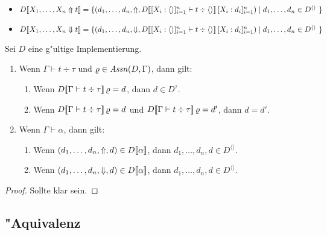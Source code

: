 \documentclass[%
  12pt,%
  a4paper,%
]{article}
\newcommand{\Tj}[3]{{#1}\vdash{#2}\div{#3}}
\begin{document}
\begin{itemize}
\item $D\sem{X_1,\ldots,X_n \Uparrow t} \\
  =
  \{(d_1,\ldots,d_n,\Uparrow,D\sem{\Tj{[X_i:\langle\rangle]_{i=1}^n}{t}{\langle \rangle}}\,[X_i:d_i]_{i=1}^n) \mid
    \text{$d_1,\ldots,d_n \in D^{\langle \rangle}$ }
  \}$
\item $D\sem{X_1,\ldots,X_n \Downarrow t} \\
  =
  \{(d_1,\ldots,d_n,\Downarrow,D\sem{\Tj{[X_i:\langle\rangle]_{i=1}^n}{t}{\langle \rangle}}\,[X_i:d_i]_{i=1}^n) \mid
    \text{$d_1,\ldots,d_n \in D^{\langle \rangle}$ }
  \}$
\end{itemize}

\begin{lemma} \label{lem:Wohldefiniertheit_der_Semantik}
  Sei $D$ eine g"ultige Implementierung.
  \begin{enumerate}
  \item Wenn $\Tj{\Gamma}{t}{\tau}$ und $\varrho \in \mathit{Assn}(D,\Gamma)$, dann gilt:
    \begin{enumerate}
    \item Wenn $D\sem{\Tj{\Gamma}{t}{\tau}}\,\varrho = d$, dann $d \in D^\tau$.
    \item Wenn $D\sem{\Tj{\Gamma}{t}{\tau}}\,\varrho = d$ und $D\sem{\Tj{\Gamma}{t}{\tau}}\,\varrho = d'$,
      dann $d = d'$.
    \end{enumerate}

  \item Wenn $\Gamma \vdash \alpha$, dann gilt:
    \begin{enumerate}
    \item Wenn $(d_1,\ldots,d_n,\Uparrow,d) \in D[\![\alpha]\!]$,
      dann $d_1,\ldots,d_n,d \in D^{\langle\rangle}$.
    \item Wenn $(d_1,\ldots,d_n,\Downarrow,d) \in D[\![\alpha]\!]$,
      dann $d_1,\ldots,d_n,d \in D^{\langle\rangle}$.
    \end{enumerate}
  \end{enumerate}
\end{lemma}

\begin{proof}
  Sollte klar sein.
\end{proof}

\subsection*{"Aquivalenz}
\end{document}
